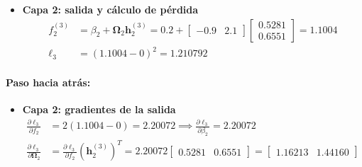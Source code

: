 \documentclass[10pt,a4paper]{article}
\begin{document}
\begin{itemize}
    \item \textbf{Capa 2: salida y cálculo de pérdida}
    \begin{align*}
    f_2^{(3)} &= \beta_2 + \boldsymbol{\Omega}_2 \mathbf{h}_2^{(3)} = 0.2 + \begin{bmatrix} -0.9 & 2.1 \end{bmatrix} \begin{bmatrix} 0.5281 \\ 0.6551 \end{bmatrix} = 1.1004 \\[0.1cm]
    \ell_3 &= (1.1004 - 0)^2 = \mathbf{1.210792}
    \end{align*}
\end{itemize}

{\setlength{\abovedisplayskip}{2pt}\setlength{\belowdisplayskip}{2pt}
\paragraph{Paso hacia atrás:}
\begin{itemize}\itemsep-3pt   
    \item \textbf{Capa 2: gradientes de la salida}
    \begin{align*}
    \frac{\partial \ell_3}{\partial f_2} &= 2(1.1004 - 0) = 2.20072 \implies \frac{\partial \ell_3}{\partial \beta_2} = \mathbf{2.20072} \\[0.1cm]
    \frac{\partial \ell_3}{\partial \boldsymbol{\Omega}_2} &= \frac{\partial \ell_3}{\partial f_2} (\mathbf{h}_2^{(3)})^T = 2.20072 \begin{bmatrix} 0.5281 & 0.6551 \end{bmatrix} = \mathbf{\begin{bmatrix} 1.16213 & 1.44160 \end{bmatrix}}
    \end{align*}


\end{itemize}}
\end{document}
